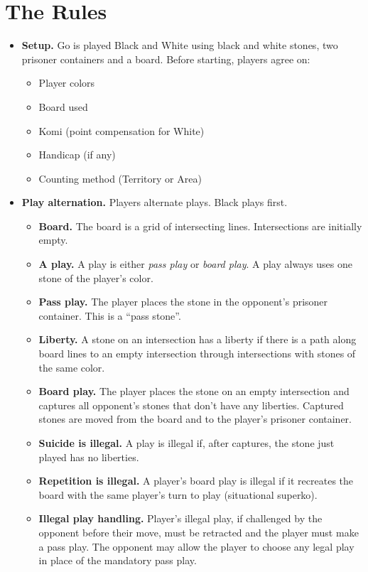 \documentclass[11pt]{article}
\begin{document}
\newpage
\section{The Rules}

\begin{itemize}
\item \textbf{Setup.} Go is played Black and White using black and white stones, two prisoner containers and a board. Before starting, players agree on:
    \begin{itemize}
    \item Player colors
    \item Board used
    \item Komi (point compensation for White)
    \item Handicap (if any)
    \item Counting method (Territory or Area)
    \end{itemize}

\item \textbf{Play alternation.} Players alternate plays. Black plays first.
    \begin{itemize}
    \item \textbf{Board.} The board is a grid of intersecting lines. Intersections are initially empty.
    \item \textbf{A play.} A play is either \textit{pass play} or \textit{board play}. A play always uses one stone of the player's color.
    \item \textbf{Pass play.} The player places the stone in the opponent's prisoner container. This is a ``pass stone''.
    \item \textbf{Liberty.} A stone on an intersection has a liberty if there is a path along board lines to an empty intersection through intersections with stones of the same color.
    \item \textbf{Board play.} The player places the stone on an empty intersection and captures all opponent's stones that don't have any liberties. Captured stones are moved from the board and to the player's prisoner container.
    \item \textbf{Suicide is illegal.} A play is illegal if, after captures, the stone just played has no liberties.
    \item \textbf{Repetition is illegal.} A player's board play is illegal if it recreates the board with the same player's turn to play (situational superko).
    \item \textbf{Illegal play handling.} Player's illegal play, if challenged by the opponent before their move, must be retracted and the player must make a pass play. The opponent may allow the player to choose any legal play in place of the mandatory pass play.
    \end{itemize}


\end{itemize}
\end{document}
